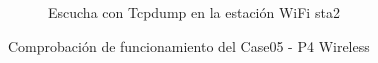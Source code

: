\begin{figure}[h!]
\begin{subfigure}[b]{\textwidth}
        \caption{Escucha con Tcpdump en la estación WiFi sta2}
        \label{fig:case05_p4_wifi_func_list2}
    \end{subfigure}
    
    \caption{Comprobación de funcionamiento del Case05 - P4 Wireless}
    \label{fig:case05_p4_wifi_func1}
\end{figure}